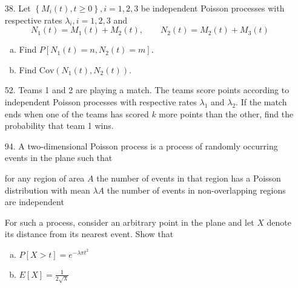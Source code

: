 \documentclass{article}
\newcommand{\cov}{\mathrm{Cov}}
\begin{document}
\begin{itemize}
	\item[38.] Let $\left\{ M_i(t), t\ge 0 \right\}, i=1, 2, 3$ be independent Poisson processes with respective rates $\lambda_i, i=1, 2, 3$ and
		\[N_1(t)=M_1(t)+M_2(t), \quad\quad N_2(t)=M_2(t)+M_3(t)\]
		\begin{enumerate}[(a)]
			\item Find $P[N_1(t)=n, N_2(t)=m].$

			\item Find $\cov(N_1(t), N_2(t)).$
				
		\end{enumerate}

	\item[52.] Teams 1 and 2 are playing a match. The teams score points according to independent Poisson processes with respective rates $\lambda_1$ and $\lambda_2.$ If the match ends when one of the teams has scored $k$ more points than the other, find the probability that team 1 wins.

	\item[94.] A two-dimensional Poisson process is a process of randomly occurring events in the plane such that
		\begin{enumerate}[(i)]
			\ii for any region of area $A$ the number of events in that region has a Poisson distribution with mean $\lambda A$
			\ii the number of events in non-overlapping regions are independent
		\end{enumerate}
		For such a process, consider an arbitrary point in the plane and let $X$ denote its distance from its nearest event. Show that
		\begin{enumerate}[(a)]
			\item $P[X>t]=e^{-\lambda \pi t^2}$

			\item $E[X]=\frac{1}{2\sqrt{\lambda}}$
				
		\end{enumerate}
		
\end{itemize}
\end{document}
